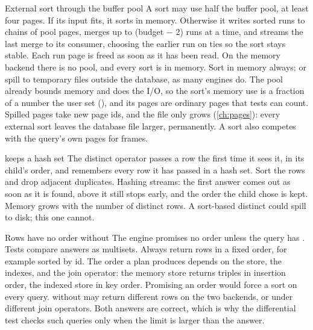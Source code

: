 \begin{decision}{External sort through the buffer pool}
 A sort may use half the buffer pool, at least four pages. If
its input fits, it sorts in memory. Otherwise it writes sorted runs to chains
of pool pages, merges up to (budget $-$ 2) runs at a time, and streams the last
merge to its consumer, choosing the earlier run on ties so the sort stays
stable. Each run page is freed as soon as it has been read. On the memory
backend there is no pool, and every sort is in memory.
 Sort in memory always; or spill to temporary files outside
the database, as many engines do.
 The pool already bounds memory and does the I/O, so the sort's
memory use is a fraction of a number the user set (), and its
pages are ordinary pages that tests can count.
 Spilled pages take new page ids, and the file only grows
(\cref{ch:pages}): every external sort leaves the database file larger,
permanently. A sort also competes with the query's own pages for frames.
\end{decision}

\begin{decision}{ keeps a hash set}
 The distinct operator passes a row the first time it sees it,
in its child's order, and remembers every row it has passed in a hash set.
 Sort the rows and drop adjacent duplicates.
 Hashing streams: the first answer comes out as soon as it is
found,  above it still stops early, and the order the child chose
is kept.
 Memory grows with the number of distinct rows. A sort-based
distinct could spill to disk; this one cannot.
\end{decision}

\begin{decision}{Rows have no order without }
 The engine promises no order unless the query has
. Tests compare answers as multisets.
 Always return rows in a fixed order, for example sorted by
id.
 The order a plan produces depends on the store, the indexes, and
the join operator: the memory store returns triples in insertion order, the
indexed store in key order. Promising an order would force a sort on every
query.
  without  may return different rows on
the two backends, or under different join operators. Both answers are correct,
which is why the differential test checks such queries only when the limit is
larger than the answer.
\end{decision}

